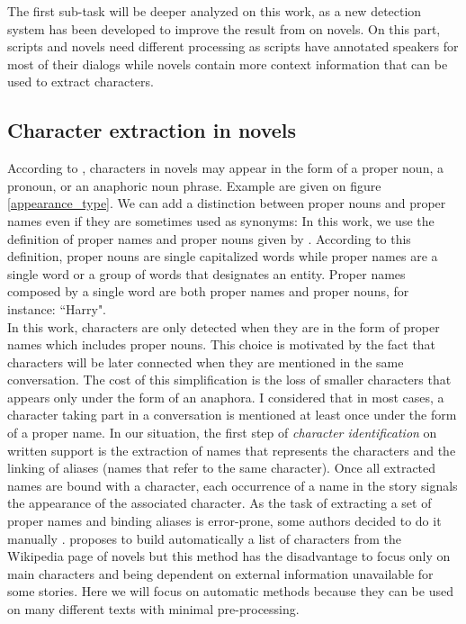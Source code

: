 \documentclass[a4paper, 12pt]{report}
\begin{document}
The first sub-task will be deeper analyzed on this work, as a new detection system has been developed to improve the result from \cite{original} on novels. On this part, scripts and novels need different processing as scripts have annotated speakers for most of their dialogs while novels contain more context information that can be used to extract characters.


\subsection{Character extraction in novels}
According to \cite{fiction}, characters in novels may appear in the form of a proper noun, a pronoun, or an anaphoric noun phrase. Example are given on figure \ref{appearance_type}.
We can add a distinction between proper nouns and proper names even if they are sometimes used as synonyms:
In this work, we use the definition of proper names and proper nouns given by \cite{properNames}.
According to this definition, proper nouns are single capitalized words while proper names are a single word or a group of words that designates an entity.
Proper names composed by a single word are both proper names and proper nouns, for instance: ``Harry".\\

In this work, characters are only detected when they are in the form of proper names which includes proper nouns.
This choice is motivated by the fact that characters will be later connected when they are mentioned in the same conversation.
The cost of this simplification is the loss of smaller characters that appears only under the form of an anaphora.
I considered that in most cases, a character taking part in a conversation is mentioned at least once under the form of a proper name.
In our situation, the first step of \textit{character identification} on written support is the extraction of names that represents the characters and the linking of aliases (names that refer to the same character).
Once all extracted names are bound with a character, each occurrence of a name in the story signals the appearance of the associated character.
As the task of extracting a set of proper names and binding aliases is error-prone, some authors decided to do it manually \citep{agarwal-etal-2013-automatic}.
\cite{he-etal-2013-identification} proposes to build automatically a list of characters from the Wikipedia page of novels but this method has the disadvantage to focus only on main characters and
being dependent on external information unavailable for some stories.
Here we will focus on automatic methods because they can be used on many different texts with minimal pre-processing.\\
\end{document}
